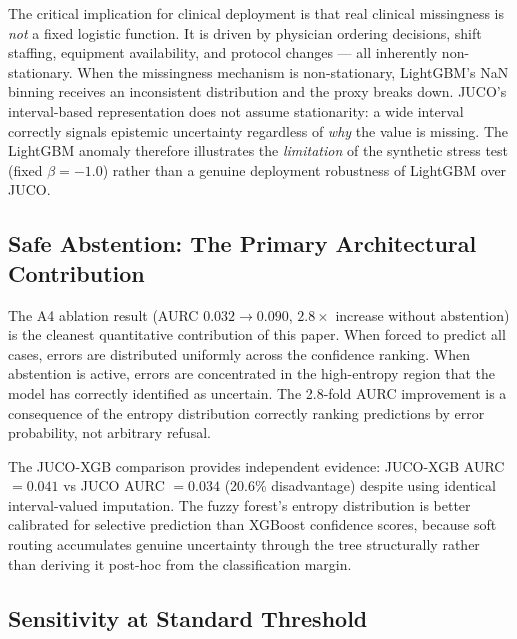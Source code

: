 \documentclass[a4paper,fleqn,longmktitle]{cas-sc}
\begin{document}
	The critical implication for clinical deployment is that real
	clinical missingness is \emph{not} a fixed logistic function.
	It is driven by physician ordering decisions, shift staffing,
	equipment availability, and protocol changes — all inherently
	non-stationary.
	When the missingness mechanism is non-stationary, LightGBM's NaN
	binning receives an inconsistent distribution and the proxy breaks
	down.
	JUCO's interval-based representation does not assume stationarity:
	a wide interval correctly signals epistemic uncertainty regardless
	of \emph{why} the value is missing.
	The LightGBM anomaly therefore illustrates the \emph{limitation}
	of the synthetic stress test (fixed $\beta = -1.0$) rather than
	a genuine deployment robustness of LightGBM over JUCO.
	
	\subsection{Safe Abstention: The Primary Architectural Contribution}
	\label{sec:abstention_discussion}
	
	The A4 ablation result (AURC $0.032 \to 0.090$, $2.8{\times}$
	increase without abstention) is the cleanest quantitative
	contribution of this paper.
	When forced to predict all cases, errors are distributed uniformly
	across the confidence ranking.
	When abstention is active, errors are concentrated in the
	high-entropy region that the model has correctly identified as
	uncertain.
	The 2.8-fold AURC improvement is a consequence of the entropy
	distribution correctly ranking predictions by error probability,
	not arbitrary refusal.
	
	The JUCO-XGB comparison provides independent evidence: JUCO-XGB
	AURC $= 0.041$ vs JUCO AURC $= 0.034$ (20.6\% disadvantage)
	despite using identical interval-valued imputation.
	The fuzzy forest's entropy distribution is better calibrated for
	selective prediction than XGBoost confidence scores, because soft
	routing accumulates genuine uncertainty through the tree structurally
	rather than deriving it post-hoc from the classification margin.
	
	\subsection{Sensitivity at Standard Threshold}
	\label{sec:sensitivity_discussion}
	
\end{document}
